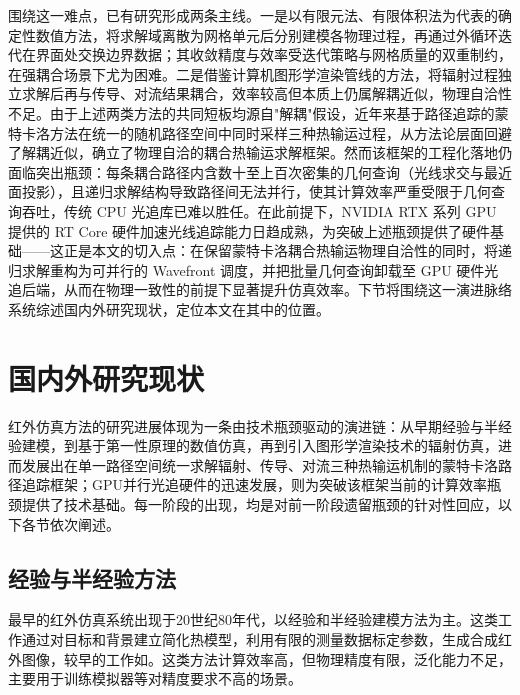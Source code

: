 围绕这一难点，已有研究形成两条主线。一是以有限元法、有限体积法为代表的确定性数值方法，将求解域离散为网格单元后分别建模各物理过程，再通过外循环迭代在界面处交换边界数据；其收敛精度与效率受迭代策略与网格质量的双重制约，在强耦合场景下尤为困难\cite{modestRadiativeHeatTransfer2013}。二是借鉴计算机图形学渲染管线的方法，将辐射过程独立求解后再与传导、对流结果耦合，效率较高但本质上仍属解耦近似，物理自洽性不足。由于上述两类方法的共同短板均源自"解耦"假设，近年来基于路径追踪的蒙特卡洛方法在统一的随机路径空间中同时采样三种热输运过程\cite{batiCouplingConductionConvection2023}，从方法论层面回避了解耦近似，确立了物理自洽的耦合热输运求解框架。然而该框架的工程化落地仍面临突出瓶颈：每条耦合路径内含数十至上百次密集的几何查询（光线求交与最近面投影），且递归求解结构导致路径间无法并行，使其计算效率严重受限于几何查询吞吐，传统 CPU 光追库已难以胜任。在此前提下，NVIDIA RTX 系列 GPU 提供的 RT Core 硬件加速光线追踪能力日趋成熟，为突破上述瓶颈提供了硬件基础——这正是本文的切入点：在保留蒙特卡洛耦合热输运物理自洽性的同时，将递归求解重构为可并行的 Wavefront 调度，并把批量几何查询卸载至 GPU 硬件光追后端，从而在物理一致性的前提下显著提升仿真效率。下节将围绕这一演进脉络系统综述国内外研究现状，定位本文在其中的位置。


\section{国内外研究现状}

红外仿真方法的研究进展体现为一条由技术瓶颈驱动的演进链\cite{upadhyayComprehensiveSurveySynthetic2025,LuQiHongWaiChangJingFangZhenFangFaJiFaZhanXianZhuangYanJiuZongShu2024,WangXiaHongWaiChangJingFangZhenJiShuFaZhanZongShu2015}：从早期经验与半经验建模，到基于第一性原理的数值仿真，再到引入图形学渲染技术的辐射仿真，进而发展出在单一路径空间统一求解辐射、传导、对流三种热输运机制的蒙特卡洛路径追踪框架；GPU并行光追硬件的迅速发展，则为突破该框架当前的计算效率瓶颈提供了技术基础。每一阶段的出现，均是对前一阶段遗留瓶颈的针对性回应，以下各节依次阐述。

\subsection{经验与半经验方法}

最早的红外仿真系统出现于20世纪80年代，以经验和半经验建模方法为主。这类工作通过对目标和背景建立简化热模型，利用有限的测量数据标定参数，生成合成红外图像，较早的工作如\cite{jacobsSimulationThermalBehaviour1980,ben-yosefSimulationIRImages1983,kornfeldComputerGenerationInfrared1985}。这类方法计算效率高，但物理精度有限，泛化能力不足，主要用于训练模拟器等对精度要求不高的场景\cite{bieselRealtimeSimulatedForward1987}。

